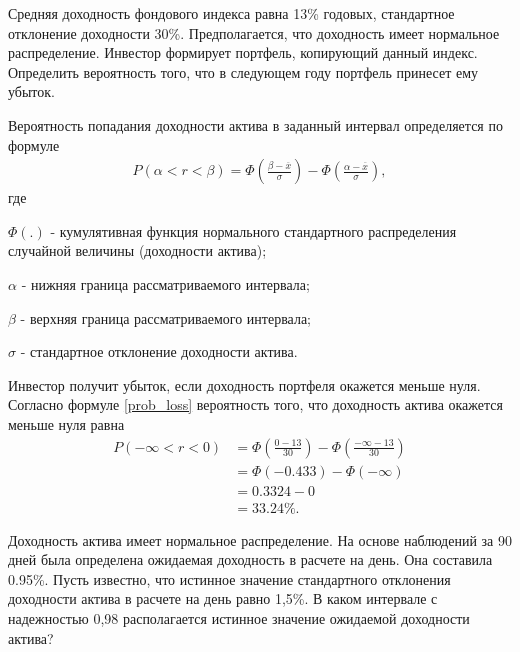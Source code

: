 \documentclass[12pt, table, twoside, a4paper]{exam}
\begin{document}
\begin{questions}
\begin{subparts}
\end{subparts}
\addpoints

\question[5] Средняя доходность фондового индекса равна 13\% годовых, стандартное отклонение доходности 30\%. Предполагается, что доходность имеет нормальное распределение. Инвестор формирует портфель, копирующий данный индекс. Определить вероятность того, что в следующем году портфель принесет ему убыток.

\begin{solution}[6em]
	
	\raggedright
	Вероятность   попадания   доходности   актива   в   заданный интервал определяется по формуле 
	\begin{align}
	\label{prob_loss}
	P(\alpha<r<\beta)=\Phi\left(\frac{\beta-\overline{x}}{\sigma}\right)-\Phi\left(\frac{\alpha-\overline{x}}{\sigma}\right),
	\end{align}
	где 
	
	$\Phi(.) $ - кумулятивная функция нормального стандартного распределения случайной величины (доходности актива);
	
	$\alpha $ - нижняя граница рассматриваемого интервала;
	
	$\beta $ - верхняя граница рассматриваемого интервала;
	
	$\sigma $ - стандартное отклонение доходности актива.
	
	Инвестор получит убыток, если доходность портфеля окажется меньше нуля. Согласно формуле \eqref{prob_loss} вероятность того, что доходность актива окажется меньше нуля равна
	\begin{align*}
	P(-\infty<r<0)&=\Phi\left(\frac{0-13}{30}\right)-\Phi\left(\frac{-\infty-13}{30}\right)\\
	&=\Phi(-0.433)-\Phi(-\infty)\\
	&=0.3324-0\\
	&=33.24\%.
	\end{align*}
\end{solution}

\addpoints

\question[10] Доходность актива имеет нормальное распределение. На основе наблюдений за 90 дней была определена ожидаемая доходность в расчете на день. Она составила 0.95\%. Пусть известно, что истинное значение стандартного отклонения доходности актива в расчете на день равно 1,5\%. В каком интервале с надежностью 0,98 располагается истинное значение ожидаемой доходности актива?

\begin{solution}[8em]
	

\end{solution}
\end{questions}
\end{document}
